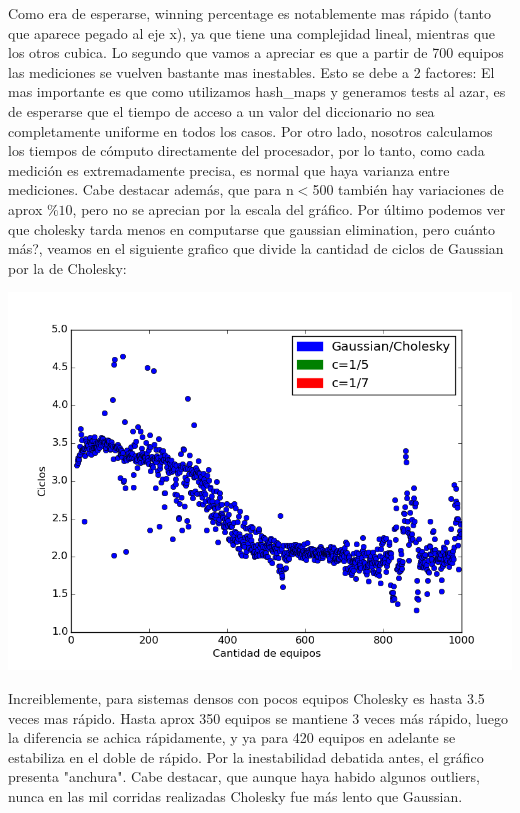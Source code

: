  Como era de esperarse, winning percentage es notablemente mas rápido (tanto que aparece pegado al eje x), ya que tiene una complejidad lineal, mientras que los otros cubica. Lo segundo que vamos a apreciar es que a partir de 700 equipos las mediciones se vuelven bastante mas inestables. Esto se debe a 2 factores: El mas importante es que como utilizamos hash_maps y generamos tests al azar, es de esperarse que el tiempo de acceso a un valor del diccionario no sea completamente uniforme en todos los casos. Por otro lado, nosotros calculamos los tiempos de cómputo directamente del procesador, por lo tanto, como cada medición es extremadamente precisa, es normal que haya varianza entre mediciones. Cabe destacar además, que para n$<$500 también hay variaciones de aprox $\%10$, pero no se aprecian por la escala del gráfico.
 Por último podemos ver que cholesky tarda menos en computarse que gaussian elimination, pero cuánto más?, veamos en el siguiente grafico que divide la cantidad de ciclos de Gaussian por la de Cholesky:
 
 \includegraphics[scale=0.7]{img/gaussianvscholesky.png}
 
 Increiblemente, para sistemas densos con pocos equipos Cholesky es hasta 3.5 veces mas rápido. Hasta aprox 350 equipos se mantiene 3 veces más rápido, luego la diferencia se achica rápidamente, y ya para 420 equipos en adelante se estabiliza en el doble de rápido. Por la inestabilidad debatida antes, el gráfico presenta "anchura". Cabe destacar, que aunque haya habido algunos outliers, nunca en las mil corridas realizadas Cholesky fue más lento que Gaussian.
 
